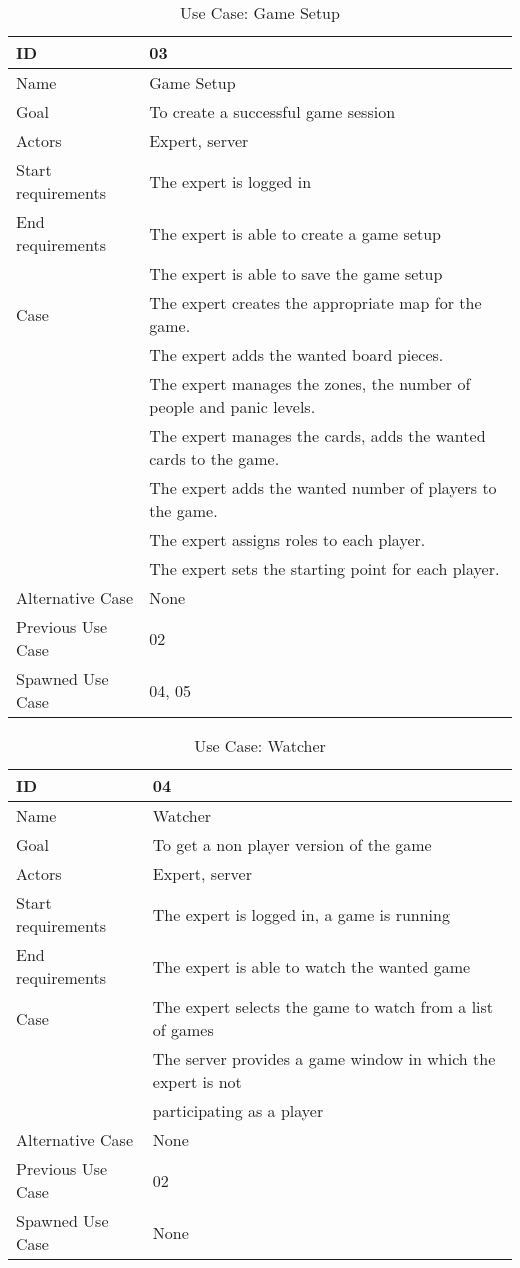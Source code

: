 \begin{table}[H]
\begin{tabular}{|l|l|} \hline
	\textbf{ID} & \textbf{03}\\ \hline
	Name & Game Setup\\ \hline
	Goal & To create a successful game session\\ \hline
	Actors & Expert, server\\ \hline
	Start requirements & The expert is logged in\\ \hline
	End requirements & The expert is able to create a game setup \\ 
						& The expert is able to save the game setup\\ \hline
	Case & The expert creates the appropriate map for the game.\\
			& The expert adds the wanted board pieces.\\
			& The expert manages the zones, the number of people and panic levels.\\
			& The expert manages the cards, adds the wanted cards to the game.\\
			& The expert adds the wanted number of players to the game.\\
			& The expert assigns roles to each player. \\
			& The expert sets the starting point for each player.\\ \hline
	Alternative Case & None \\ \hline
	Previous Use Case & 02\\ \hline
	Spawned Use Case & 04, 05\\ \hline
\end{tabular}
\caption{Use Case: Game Setup}
\label{fig:usecase03table}
\end{table}

\begin{table}[H]
\begin{tabular}{|l|l|}
\hline
	\textbf{ID} & \textbf{04}\\ \hline
	Name & Watcher\\ \hline
	Goal & To get a non player version of the game\\ \hline
	Actors & Expert, server\\ \hline
	Start requirements & The expert is logged in, a game is running \\ \hline
	End requirements & The expert is able to watch the wanted game\\ \hline
	Case & The expert selects the game to watch from a list of games\\
		 & The server provides a game window in which the expert is not\\ 
		 & participating as a player\\ \hline
	Alternative Case & None \\ \hline
	Previous Use Case & 02\\ \hline
	Spawned Use Case & None\\ \hline
\end{tabular}
\caption{Use Case: Watcher}
\label{fig:usecase04table}
\end{table}

